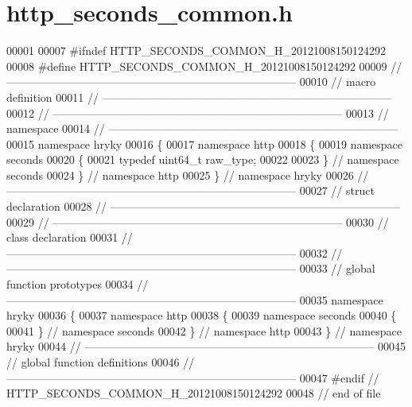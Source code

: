\hypertarget{http__seconds__common_8h_source}{\section{http\-\_\-seconds\-\_\-common.\-h}
}

\begin{DoxyCode}
00001 
00007 \textcolor{preprocessor}{#ifndef HTTP\_SECONDS\_COMMON\_H\_20121008150124292}
00008 \textcolor{preprocessor}{}\textcolor{preprocessor}{#define HTTP\_SECONDS\_COMMON\_H\_20121008150124292}
00009 \textcolor{preprocessor}{}\textcolor{comment}{//
      ------------------------------------------------------------------------------}
00010 \textcolor{comment}{// macro definition}
00011 \textcolor{comment}{//
      ------------------------------------------------------------------------------}
00012 \textcolor{comment}{//
      ------------------------------------------------------------------------------}
00013 \textcolor{comment}{// namespace}
00014 \textcolor{comment}{//
      ------------------------------------------------------------------------------}
00015 \textcolor{keyword}{namespace }hryky
00016 \{
00017 \textcolor{keyword}{namespace }http
00018 \{
00019 \textcolor{keyword}{namespace }seconds
00020 \{
00021     \textcolor{keyword}{typedef} uint64\_t raw\_type;
00022 
00023 \} \textcolor{comment}{// namespace seconds}
00024 \} \textcolor{comment}{// namespace http}
00025 \} \textcolor{comment}{// namespace hryky}
00026 \textcolor{comment}{//
      ------------------------------------------------------------------------------}
00027 \textcolor{comment}{// struct declaration}
00028 \textcolor{comment}{//
      ------------------------------------------------------------------------------}
00029 \textcolor{comment}{//
      ------------------------------------------------------------------------------}
00030 \textcolor{comment}{// class declaration}
00031 \textcolor{comment}{//
      ------------------------------------------------------------------------------}
00032 \textcolor{comment}{//
      ------------------------------------------------------------------------------}
00033 \textcolor{comment}{// global function prototypes}
00034 \textcolor{comment}{//
      ------------------------------------------------------------------------------}
00035 \textcolor{keyword}{namespace }hryky
00036 \{
00037 \textcolor{keyword}{namespace }http
00038 \{
00039 \textcolor{keyword}{namespace }seconds
00040 \{
00041 \} \textcolor{comment}{// namespace seconds}
00042 \} \textcolor{comment}{// namespace http}
00043 \} \textcolor{comment}{// namespace hryky}
00044 \textcolor{comment}{//
      ------------------------------------------------------------------------------}
00045 \textcolor{comment}{// global function definitions}
00046 \textcolor{comment}{//
      ------------------------------------------------------------------------------}
00047 \textcolor{preprocessor}{#endif // HTTP\_SECONDS\_COMMON\_H\_20121008150124292}
00048 \textcolor{preprocessor}{}\textcolor{comment}{// end of file}
\end{DoxyCode}
